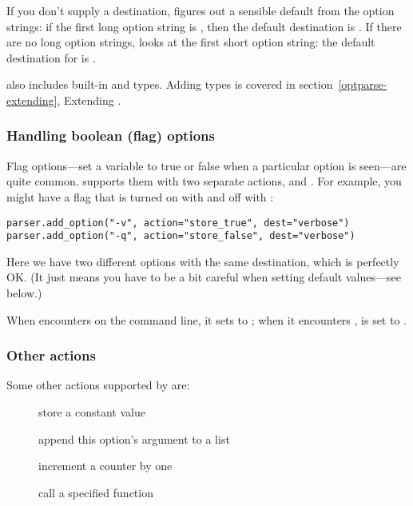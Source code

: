 If you don't supply a destination,  figures out a sensible default
from the option strings: if the first long option string is
, then the default destination is .  If there
are no long option strings,  looks at the first short option
string: the default destination for  is .

 also includes built-in  and  types.  Adding
types is covered in section~\ref{optparse-extending}, Extending .


\subsubsection{Handling boolean (flag) options\label{optparse-handling-boolean-options}}

Flag options{---}set a variable to true or false when a particular option
is seen{---}are quite common.   supports them with two separate
actions,  and .  For example, you might have a
 flag that is turned on with  and off with :
\begin{verbatim}
parser.add_option("-v", action="store_true", dest="verbose")
parser.add_option("-q", action="store_false", dest="verbose")
\end{verbatim}

Here we have two different options with the same destination, which is
perfectly OK.  (It just means you have to be a bit careful when setting
default values{---}see below.)

When  encounters  on the command line, it sets
 to ; when it encounters ,
 is set to .


\subsubsection{Other actions\label{optparse-other-actions}}

Some other actions supported by  are:
\begin{description}
\item[]
store a constant value
\item[]
append this option's argument to a list
\item[]
increment a counter by one
\item[]
call a specified function
\end{description}

